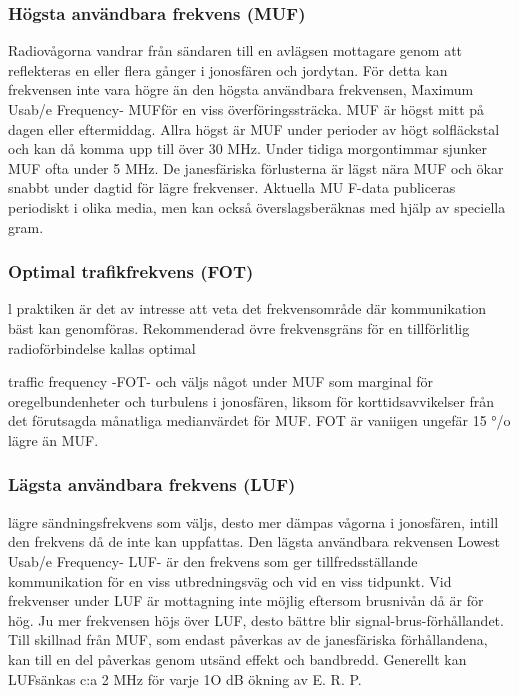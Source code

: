 \subsubsection{Högsta användbara frekvens (MUF)}

Radiovågorna vandrar från sändaren till en
avlägsen mottagare genom att reflekteras
en eller flera gånger i jonosfären och jordytan. För detta kan frekvensen inte vara
högre än den högsta användbara frekvensen, Maximum Usab/e Frequency- MUFför en viss överföringssträcka.
MUF är högst mitt på dagen eller
eftermiddag. Allra högst är MUF under perioder av högt solfläckstal och kan då komma
upp till över 30 MHz. Under tidiga morgontimmar sjunker MUF ofta under 5 MHz.
De janesfäriska förlusterna är lägst nära
MUF och ökar snabbt under dagtid för lägre
frekvenser.
Aktuella MU F-data publiceras periodiskt
i olika media, men kan också överslagsberäknas med hjälp av speciella
gram.

\subsubsection{Optimal trafikfrekvens (FOT)}
l praktiken är det av intresse att veta det
frekvensområde där kommunikation bäst kan
genomföras.
Rekommenderad övre frekvensgräns för
en tillförlitlig radioförbindelse kallas optimal

traffic frequency -FOT- och väljs något under MUF som marginal för oregelbundenheter och turbulens i jonosfären, liksom för
korttidsavvikelser från det förutsagda månatliga medianvärdet för MUF. FOT är vaniigen ungefär 15 °/o lägre än MUF.


\subsubsection{Lägsta användbara frekvens (LUF)}

lägre sändningsfrekvens som väljs, desto
mer dämpas vågorna i jonosfären, intill den
frekvens då de inte kan uppfattas. Den lägsta användbara rekvensen Lowest Usab/e
Frequency- LUF- är den frekvens som ger
tillfredsställande kommunikation för en viss
utbredningsväg och vid en viss tidpunkt.
Vid frekvenser under LUF är mottagning
inte möjlig eftersom brusnivån då är för hög.
Ju mer frekvensen höjs över LUF, desto
bättre blir signal-brus-förhållandet.
Till skillnad från MUF, som endast påverkas av de janesfäriska förhållandena, kan
till en del påverkas genom utsänd effekt
och bandbredd. Generellt kan LUFsänkas
c:a 2 MHz för varje 1O dB ökning av E. R. P.


